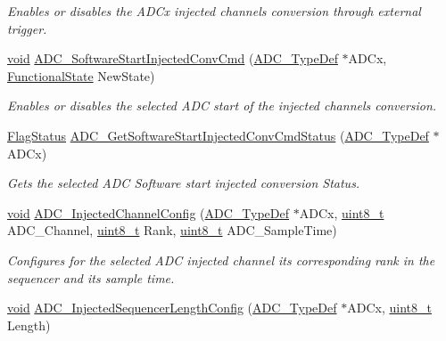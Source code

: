 \begin{DoxyCompactItemize}
\begin{DoxyCompactList}\small\item\em Enables or disables the A\+D\+Cx injected channels conversion through external trigger. \end{DoxyCompactList}\item 
\hyperlink{usb__devapi_8h_afabf60e7f57651d6d595a02c75f07cd0}{void} \hyperlink{group___a_d_c___private___functions_ga5b141d5dbf5f417a11dfa622c8c149d3}{A\+D\+C\+\_\+\+Software\+Start\+Injected\+Conv\+Cmd} (\hyperlink{struct_a_d_c___type_def}{A\+D\+C\+\_\+\+Type\+Def} $\ast$A\+D\+Cx, \hyperlink{agilefox_2library_2inc_2stm32f10x__type_8h_ac9a7e9a35d2513ec15c3b537aaa4fba1}{Functional\+State} New\+State)
\begin{DoxyCompactList}\small\item\em Enables or disables the selected A\+DC start of the injected channels conversion. \end{DoxyCompactList}\item 
\hyperlink{agilefox_2library_2inc_2stm32f10x__type_8h_a89136caac2e14c55151f527ac02daaff}{Flag\+Status} \hyperlink{group___a_d_c___private___functions_ga8765f8835b8cfed13dce3d8d71767dcc}{A\+D\+C\+\_\+\+Get\+Software\+Start\+Injected\+Conv\+Cmd\+Status} (\hyperlink{struct_a_d_c___type_def}{A\+D\+C\+\_\+\+Type\+Def} $\ast$A\+D\+Cx)
\begin{DoxyCompactList}\small\item\em Gets the selected A\+DC Software start injected conversion Status. \end{DoxyCompactList}\item 
\hyperlink{usb__devapi_8h_afabf60e7f57651d6d595a02c75f07cd0}{void} \hyperlink{group___a_d_c___private___functions_gae2b44bff080184e1cf6f2cb6b9bb3e59}{A\+D\+C\+\_\+\+Injected\+Channel\+Config} (\hyperlink{struct_a_d_c___type_def}{A\+D\+C\+\_\+\+Type\+Def} $\ast$A\+D\+Cx, \hyperlink{_p_e___types_8h_aba7bc1797add20fe3efdf37ced1182c5}{uint8\+\_\+t} A\+D\+C\+\_\+\+Channel, \hyperlink{_p_e___types_8h_aba7bc1797add20fe3efdf37ced1182c5}{uint8\+\_\+t} Rank, \hyperlink{_p_e___types_8h_aba7bc1797add20fe3efdf37ced1182c5}{uint8\+\_\+t} A\+D\+C\+\_\+\+Sample\+Time)
\begin{DoxyCompactList}\small\item\em Configures for the selected A\+DC injected channel its corresponding rank in the sequencer and its sample time. \end{DoxyCompactList}\item 
\hyperlink{usb__devapi_8h_afabf60e7f57651d6d595a02c75f07cd0}{void} \hyperlink{group___a_d_c___private___functions_ga24eba90bc3ee955e07659a605011710d}{A\+D\+C\+\_\+\+Injected\+Sequencer\+Length\+Config} (\hyperlink{struct_a_d_c___type_def}{A\+D\+C\+\_\+\+Type\+Def} $\ast$A\+D\+Cx, \hyperlink{_p_e___types_8h_aba7bc1797add20fe3efdf37ced1182c5}{uint8\+\_\+t} Length)

\end{DoxyCompactItemize}
